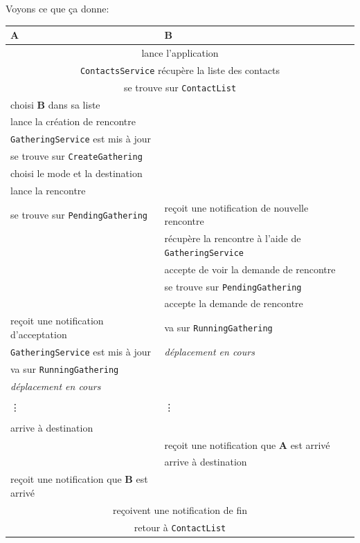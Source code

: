 \documentclass[french]{article}
\begin{document}
	Voyons ce que ça donne:
	\begin{longtable}{|l|l|}
		\hline
		\textbf{A} & \textbf{B}\\
		\hline
		\multicolumn{2}{|c|}{lance l'application}\\
		\multicolumn{2}{|c|}{\texttt{ContactsService} récupère la liste des contacts}\\
		\multicolumn{2}{|c|}{se trouve sur \texttt{ContactList}}\\
		choisi \textbf{B} dans sa liste & \\
		lance la création de rencontre & \\
		\texttt{GatheringService} est mis à jour & \\
		se trouve sur \texttt{CreateGathering} & \\
		choisi le mode et la destination & \\
		lance la rencontre & \\
		se trouve sur \texttt{PendingGathering} & reçoit une notification de nouvelle rencontre\\
		& récupère la rencontre à l'aide de \texttt{GatheringService}\\
		& accepte de voir la demande de rencontre\\
		& se trouve sur \texttt{PendingGathering}\\
		& accepte la demande de rencontre\\
		reçoit une notification d'acceptation & va sur \texttt{RunningGathering}\\
		\texttt{GatheringService} est mis à jour & \textit{déplacement en cours}\\
		va sur \texttt{RunningGathering} & \\
		\textit{déplacement en cours} & \\
		&\\
		\vdots & \vdots\\
		&\\
		arrive à destination & \\
		& reçoit une notification que \textbf{A} est arrivé\\
		& arrive à destination\\
		reçoit une notification que \textbf{B} est arrivé & \\
		\multicolumn{2}{|c|}{reçoivent une notification de fin}\\
		\multicolumn{2}{|c|}{retour à \texttt{ContactList}}\\
		\hline
	\end{longtable}
\end{document}
